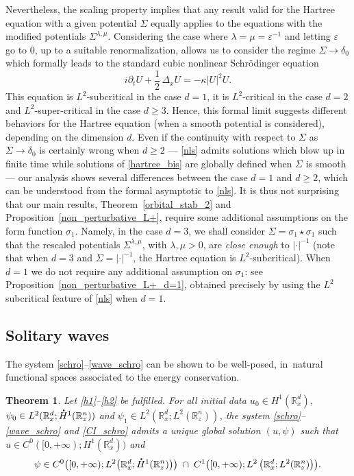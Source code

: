 \documentclass[10pt]{amsart}
\let\epsilon\varepsilon
\newtheorem{theo}[lemma]{Theorem}
\theoremstyle{definition}
\newcommand*{\overbigdot}[1]{%
\accentset{\mbox{\large\bfseries .}}{#1}}
\newcommand{\R}{\mathbb{R}}
\begin{document}
Nevertheless, the scaling property implies that any result valid for the Hartree equation with a given potential $\Sigma$ equally applies
to the equations with the modified potentials $\Sigma^{\lambda,\mu}$. Considering the case where $\lambda=\mu=\epsilon^{-1}$ and letting
$\epsilon$ go to $ 0$, up to a suitable renormalization,
allows us to consider the regime $\Sigma\to\delta_{0}$ which formally leads to the standard cubic nonlinear Schrödinger equation
\begin{equation}\label{nls}
i\partial_{t} U+\frac{1}{2}\,\Delta_{x}U=-\kappa|U|^{2}U.
\end{equation}
This equation is $L^{2}$-subcritical in the case $d=1$, it is $L^{2}$-critical in the case $d=2$ and $L^{2}$-super-critical in the case $d\geq 3$. Hence, this formal limit suggests different behaviors for the Hartree equation (when a smooth potential is considered), depending on the dimension $d$.
Even if the continuity with respect to $\Sigma$ as $\Sigma\to\delta_{0}$ is certainly wrong when $d\geq 2$ --- \eqref{nls} admits solutions which blow up in finite time while solutions of \eqref{hartree_bis} are globally defined when $\Sigma$ is smooth --- our analysis shows several differences between the case $d=1$ and $d\geq 2$, which can be understood from the formal asymptotic to \eqref{nls}. It is thus not surprising that our main results, Theorem~\ref{orbital_stab_2} and Proposition~\ref{non_perturbative_L+}, require some additional assumptions on the form function $\sigma_{1}$. Namely, in the case $d=3$, we shall
consider $\Sigma=\sigma_{1}\star\sigma_{1}$ such that
the rescaled potentials $\Sigma^{\lambda,\mu}$, with $\lambda,\mu>0$, are \emph{close enough} to $|\cdot|^{-1}$ (note that when $d=3$ and $\Sigma=|\cdot|^{-1}$, the Hartree equation is $L^{2}$-subcritical). When $d=1$ we do not require any additional assumption on $\sigma_{1}$: see Proposition~\ref{non_perturbative_L+_d=1},
obtained precisely by using the $L^2$ subcritical feature of \eqref{nls} when $d=1$.

\subsection{Solitary waves}

The system \eqref{schro}--\eqref{wave_schro} can be shown to be well-posed,
in~natural functional spaces associated to the energy conservation.

\begin{theo}\label{TC}
Let \eqref{h1}--\eqref{h2} be fulfilled. For all initial data $u_{0}\in H^{1}(\R_{x}^{d})$, $\psi_{0}\in\nobreak L^{2}(\R_{x}^{d};\overbigdot{H}^{1}(\R_{z}^{n}))$ and $\psi_{1}\in L^{2}(\R_{x}^{d};L^{2}(\R_{z}^{n}))$, the system \eqref{schro}--\eqref{wave_schro} and \eqref{CI_schro} admits a unique global solution $(u,\psi)$ such that $u\in C^{0}([0,+\infty);H^{1}(\R_{x}^{d}))$ and
\[
\psi\in C^{0}\bigl([0,+\infty);L^{2}\bigl(\R_{x}^{d};\overbigdot{H}^{1}(\R_{z}^{n})\bigr)\bigr)\;\cap\;C^{1}\bigl([0,+\infty);L^{2}\left(\R_{x}^{d};L^{2}(\R_{z}^{n})\right)\bigr).
\]
\end{theo}
\end{document}
